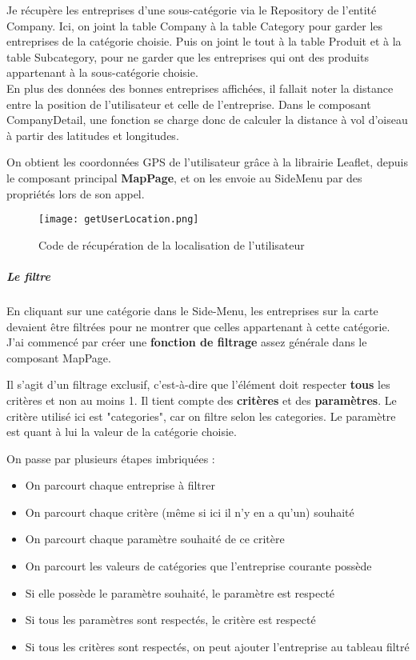 Je récupère les entreprises d'une sous-catégorie via le Repository de l'entité Company.
Ici, on joint la table Company à la table Category pour garder les entreprises de la catégorie choisie.
Puis on joint le tout à la table Produit et à la table Subcategory, pour ne garder que les entreprises qui ont des produits appartenant à la sous-catégorie choisie.\\

En plus des données des bonnes entreprises affichées, il fallait noter la distance entre la position de l'utilisateur et celle de l'entreprise. 
Dans le composant CompanyDetail, une fonction se charge donc de calculer la distance à vol d'oiseau à partir des latitudes et longitudes.

On obtient les coordonnées GPS de l'utilisateur grâce à la librairie Leaflet, depuis le composant principal \textbf{MapPage}, et on les envoie au SideMenu par des propriétés lors de son appel.

\begin{figure}[H]
    \texttt{[image: getUserLocation.png]}
    \caption{Code de récupération de la localisation de l'utilisateur}
\end{figure}

\subparagraph{Le filtre}

En cliquant sur une catégorie dans le Side-Menu, les entreprises sur la carte devaient être filtrées pour ne montrer que celles appartenant à cette catégorie.\\
J'ai commencé par créer une \textbf{fonction de filtrage} assez générale dans le composant MapPage. 

Il s'agit d'un filtrage exclusif, c'est-à-dire que l'élément doit respecter \textbf{tous} les critères et non au moins 1.
Il tient compte des \textbf{critères} et des \textbf{paramètres}. Le critère utilisé ici est "categories", car on filtre selon les categories.
Le paramètre est quant à lui la valeur de la catégorie choisie.

On passe par plusieurs étapes imbriquées :
\begin{itemize}
    \item On parcourt chaque entreprise à filtrer
    \item On parcourt chaque critère (même si ici il n'y en a qu'un) souhaité
    \item On parcourt chaque paramètre souhaité de ce critère
    \item On parcourt les valeurs de catégories que l'entreprise courante possède
    \item Si elle possède le paramètre souhaité, le paramètre est respecté
    \item Si tous les paramètres sont respectés, le critère est respecté
    \item Si tous les critères sont respectés, on peut ajouter l'entreprise au tableau filtré
\end{itemize}


